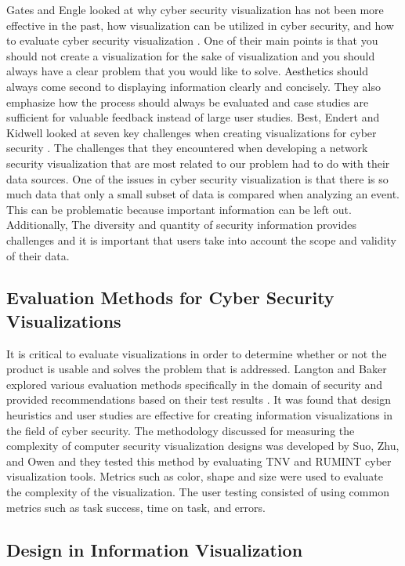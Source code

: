 \documentclass[journal]{vgtc}                %
\begin{document}
Gates and Engle looked at why cyber security visualization has not been more effective in the past, how visualization can be utilized in cyber security, and how to evaluate cyber security visualization \cite{S1}. 
One of their main points is that you should not create a visualization for the sake of visualization and you should always have a clear problem that you would like to solve. 
Aesthetics should always come second to displaying information clearly and concisely. 
They also emphasize how the process should always be evaluated and case studies are sufficient for valuable feedback instead of large user studies.  
Best, Endert and Kidwell looked at seven key challenges when creating visualizations for cyber security \cite{S2}. 
The challenges that they encountered when developing a network security visualization that are most related to our problem had to do with their data sources. 
One of the issues in cyber security visualization is that there is so much data that only a small subset of data is compared when analyzing an event. 
This can be problematic because important information can be left out. 
Additionally, The diversity and quantity of security information provides challenges and it is important that users take into account the scope and validity of their data. 

\subsection{Evaluation Methods for Cyber Security Visualizations}

It is critical to evaluate visualizations in order to determine whether or not the product is usable and solves the problem that is addressed. 
Langton and Baker explored various evaluation methods specifically in the domain of security and provided recommendations based on their test results \cite{S3}. 
It was found that design heuristics and user studies are effective for creating information visualizations in the field of cyber security. 
The methodology discussed for measuring the complexity of computer security visualization designs was developed by Suo, Zhu, and Owen \cite{S4} and they tested this method by evaluating TNV and RUMINT cyber visualization tools. 
Metrics such as color, shape and size were used to evaluate the complexity of the visualization. The user testing consisted of using common metrics such as task success, time on task, and errors. \cite{S5}

\subsection{Design in Information Visualization }
\end{document}
